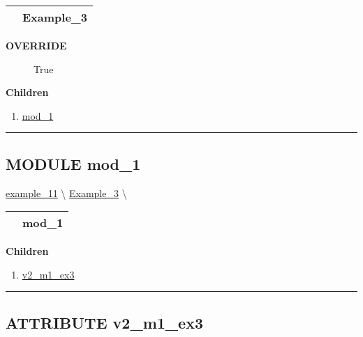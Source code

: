 {\renewcommand{\arraystretch}{1.5}
\begin{tabularx}{\textwidth}{|>{\raggedright\arraybackslash}l|X|}
\hline
\hspace{0pt}\mytexttt{\color{red} } & \textbf{Example\_3} \\
\hline
\end{tabularx}
}

\par

\par
\begin{description}
\item [\colorbox{tagtype}{\color{white} \textbf{\textsf{OVERRIDE}}}] \textbf{\underline{}} True
\end{description}

\textbf{Children}
\begin{enumerate}
\item \hyperlink{ecldoc:Inintest.Example_3.mod_1}{mod\_1}
\end{enumerate}

\rule{\linewidth}{0.5pt}

\subsection*{\textsf{\colorbox{headtoc}{\color{white} MODULE}
mod\_1}}

\hypertarget{ecldoc:Inintest.Example_3.mod_1}{}
\hspace{0pt} \hyperlink{ecldoc:example_11}{example_11} \textbackslash 
\hspace{0pt} \hyperlink{ecldoc:Inintest.Example_3}{Example_3} \textbackslash 

{\renewcommand{\arraystretch}{1.5}
\begin{tabularx}{\textwidth}{|>{\raggedright\arraybackslash}l|X|}
\hline
\hspace{0pt}\mytexttt{\color{red} } & \textbf{mod\_1} \\
\hline
\end{tabularx}
}

\par


\textbf{Children}
\begin{enumerate}
\item \hyperlink{ecldoc:inintest.example_3.mod_1.v2_m1_ex3}{v2\_m1\_ex3}
\end{enumerate}

\rule{\linewidth}{0.5pt}

\subsection*{\textsf{\colorbox{headtoc}{\color{white} ATTRIBUTE}
v2\_m1\_ex3}}

